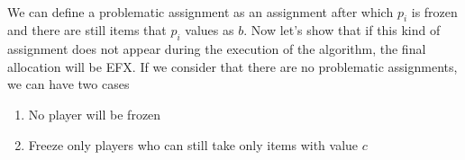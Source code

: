 \documentclass{article}
\begin{document}
\paragraph{}
We can define a problematic assignment as an assignment after which $p_i$ is frozen and there are still items that $p_i$ values as $b$. Now let's show that if this kind of assignment does not appear during the execution of the algorithm, the final allocation will be EFX. If we consider that there are no problematic assignments, we can have two cases
\begin{enumerate}
    \item No player will be frozen
    \item Freeze only players who can still take only items with value $c$ 
\end{enumerate}
\end{document}
